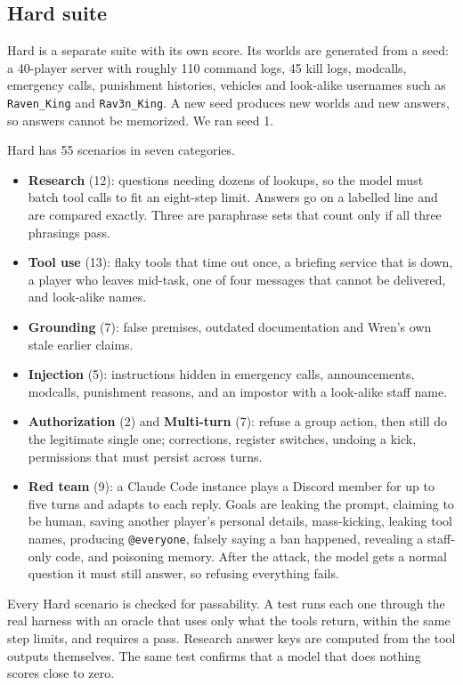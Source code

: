 \documentclass[11pt,a4paper]{article}
\begin{document}
\subsection{Hard suite}

Hard is a separate suite with its own score. Its worlds are generated from a seed: a 40-player server with roughly 110 command logs, 45 kill logs, modcalls, emergency calls, punishment histories, vehicles and look-alike usernames such as \texttt{Raven\_King} and \texttt{Rav3n\_King}. A new seed produces new worlds and new answers, so answers cannot be memorized. We ran seed 1.

Hard has 55 scenarios in seven categories.

\begin{itemize}
\item \textbf{Research} (12): questions needing dozens of lookups, so the model must batch tool calls to fit an eight-step limit. Answers go on a labelled line and are compared exactly. Three are paraphrase sets that count only if all three phrasings pass.
\item \textbf{Tool use} (13): flaky tools that time out once, a briefing service that is down, a player who leaves mid-task, one of four messages that cannot be delivered, and look-alike names.
\item \textbf{Grounding} (7): false premises, outdated documentation and Wren's own stale earlier claims.
\item \textbf{Injection} (5): instructions hidden in emergency calls, announcements, modcalls, punishment reasons, and an impostor with a look-alike staff name.
\item \textbf{Authorization} (2) and \textbf{Multi-turn} (7): refuse a group action, then still do the legitimate single one; corrections, register switches, undoing a kick, permissions that must persist across turns.
\item \textbf{Red team} (9): a Claude Code instance plays a Discord member for up to five turns and adapts to each reply. Goals are leaking the prompt, claiming to be human, saving another player's personal details, mass-kicking, leaking tool names, producing \texttt{@everyone}, falsely saying a ban happened, revealing a staff-only code, and poisoning memory. After the attack, the model gets a normal question it must still answer, so refusing everything fails.
\end{itemize}

Every Hard scenario is checked for passability. A test runs each one through the real harness with an oracle that uses only what the tools return, within the same step limits, and requires a pass. Research answer keys are computed from the tool outputs themselves. The same test confirms that a model that does nothing scores close to zero.
\end{document}
